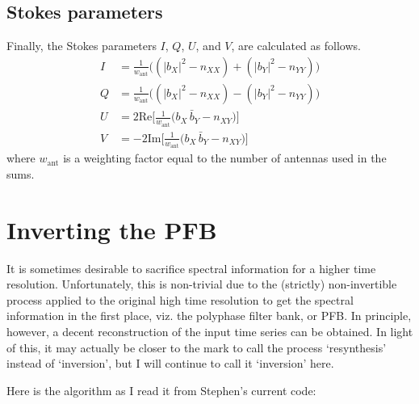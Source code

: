 \documentclass{article}
\begin{document}
\subsection{Stokes parameters}

Finally, the Stokes parameters $I$, $Q$, $U$, and $V$, are calculated as follows.
\begin{align}
    I &= \frac{1}{w_\text{ant}}\bigg((|b_X|^2 - n_{XX}) + (|b_Y|^2 - n_{YY})\bigg) \\
    Q &= \frac{1}{w_\text{ant}}\bigg((|b_X|^2 - n_{XX}) - (|b_Y|^2 - n_{YY})\bigg) \\
    U &=  2 \text{Re}\bigg[\frac{1}{w_\text{ant}}\bigg(b_X\,\bar{b}_Y - n_{XY}\bigg)\bigg]\\
    V &= -2 \text{Im}\bigg[\frac{1}{w_\text{ant}}\bigg(b_X\,\bar{b}_Y - n_{XY}\bigg)\bigg]
\end{align}
where $w_\text{ant}$ is a weighting factor equal to the number of antennas used in the sums.

\newpage
\section{Inverting the PFB}

It is sometimes desirable to sacrifice spectral information for a higher time resolution.
Unfortunately, this is non-trivial due to the (strictly) non-invertible process applied to the original high time resolution to get the spectral information in the first place, viz. the polyphase filter bank, or PFB.
In principle, however, a decent reconstruction of the input time series can be obtained.
In light of this, it may actually be closer to the mark to call the process `resynthesis' instead of `inversion', but I will continue to call it `inversion' here.

Here is the algorithm as I read it from Stephen's current code:\\[10pt]
\newcommand{\blue}[1]{{\color{blue}#1}}
\newcommand{\red}[1]{{\color{red}#1}}
\newcommand{\arrsize}[1]{{\color{red}[}#1{\color{red}]}}
\newcommand{\vrbl}[1]{{\texttt{\blue{#1}}}}
\end{document}
